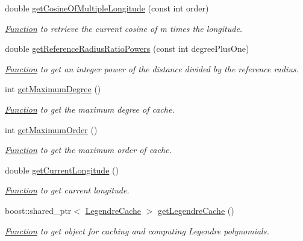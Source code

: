 \begin{DoxyCompactItemize}
double \hyperlink{classtudat_1_1basic__mathematics_1_1SphericalHarmonicsCache_a8ddfc0bda953fc78d70bd1dc9e0ce9ca}{get\+Cosine\+Of\+Multiple\+Longitude} (const int order)
\begin{DoxyCompactList}\small\item\em \hyperlink{classtudat_1_1basic__mathematics_1_1Function}{Function} to retrieve the current cosine of m times the longitude. \end{DoxyCompactList}\item 
double \hyperlink{classtudat_1_1basic__mathematics_1_1SphericalHarmonicsCache_afd6196f601d58c3737abfe0d6166cc13}{get\+Reference\+Radius\+Ratio\+Powers} (const int degree\+Plus\+One)
\begin{DoxyCompactList}\small\item\em \hyperlink{classtudat_1_1basic__mathematics_1_1Function}{Function} to get an integer power of the distance divided by the reference radius. \end{DoxyCompactList}\item 
int \hyperlink{classtudat_1_1basic__mathematics_1_1SphericalHarmonicsCache_a5c334cc9585e948a1e84d965e8c04783}{get\+Maximum\+Degree} ()
\begin{DoxyCompactList}\small\item\em \hyperlink{classtudat_1_1basic__mathematics_1_1Function}{Function} to get the maximum degree of cache. \end{DoxyCompactList}\item 
int \hyperlink{classtudat_1_1basic__mathematics_1_1SphericalHarmonicsCache_a31970fdb662cf7ad437c706d52a1beee}{get\+Maximum\+Order} ()
\begin{DoxyCompactList}\small\item\em \hyperlink{classtudat_1_1basic__mathematics_1_1Function}{Function} to get the maximum order of cache. \end{DoxyCompactList}\item 
double \hyperlink{classtudat_1_1basic__mathematics_1_1SphericalHarmonicsCache_a5fd04cdaaba4a3e9e7edebec0a39ac71}{get\+Current\+Longitude} ()
\begin{DoxyCompactList}\small\item\em \hyperlink{classtudat_1_1basic__mathematics_1_1Function}{Function} to get current longitude. \end{DoxyCompactList}\item 
boost\+::shared\+\_\+ptr$<$ \hyperlink{classtudat_1_1basic__mathematics_1_1LegendreCache}{Legendre\+Cache} $>$ \hyperlink{classtudat_1_1basic__mathematics_1_1SphericalHarmonicsCache_a5323e229117db74bde6513e92276e494}{get\+Legendre\+Cache} ()
\begin{DoxyCompactList}\small\item\em \hyperlink{classtudat_1_1basic__mathematics_1_1Function}{Function} to get object for caching and computing Legendre polynomials. \end{DoxyCompactList}\end{DoxyCompactItemize}


